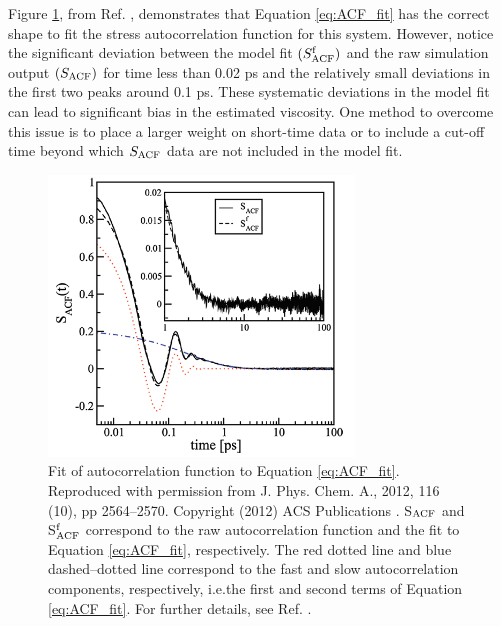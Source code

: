 \documentclass[9pt,bestpractices]{livecoms}
\providecommand{\DIFadd}[1]{{\protect\color{blue}\uwave{#1}}} %
\providecommand{\DIFaddFL}[1]{\DIFadd{#1}} %
\providecommand{\DIFaddbeginFL}{} %
\providecommand{\DIFaddendFL}{} %
\begin{document}
Figure \ref{fig:FanourgakisFig1}, from Ref. \cite{Fanourgakis2012}, demonstrates that Equation \ref{eq:ACF_fit} has the correct shape to fit the stress autocorrelation function for this system. However, notice the significant deviation between the model fit $(S^{\rm f}_{\rm ACF})$ and the raw simulation output $(S_{\rm ACF})$ for time less than 0.02 ps and the relatively small deviations in the first two peaks around 0.1 ps. These systematic deviations in the model fit can lead to significant bias in the estimated viscosity. One method to overcome this issue is to place a larger weight on short-time data or to include a cut-off time beyond which $S_{\rm ACF}$ data are not included in the model fit.

\begin{figure}[htb!]
	\centering
	\includegraphics[width=3.2in]{FanourgakisFig1.png}
	\caption{Fit of autocorrelation function to Equation \ref{eq:ACF_fit}. Reproduced with permission from J. Phys. Chem. A., 2012, 116 (10), pp 2564--2570. Copyright (2012) ACS Publications \cite{Fanourgakis2012}. S$_{\rm ACF}$ and S$^{\rm f}_{\rm ACF}$ correspond to the raw autocorrelation function and the fit to Equation \ref{eq:ACF_fit}, respectively. The red dotted line and blue dashed--dotted line correspond to the fast and slow autocorrelation components, respectively, i.e.\DIFaddbeginFL \DIFaddFL{, }\DIFaddendFL the first and second terms of Equation \ref{eq:ACF_fit}. For further details, see Ref. \cite{Fanourgakis2012}.}
	\label{fig:FanourgakisFig1}
\end{figure}
\end{document}
